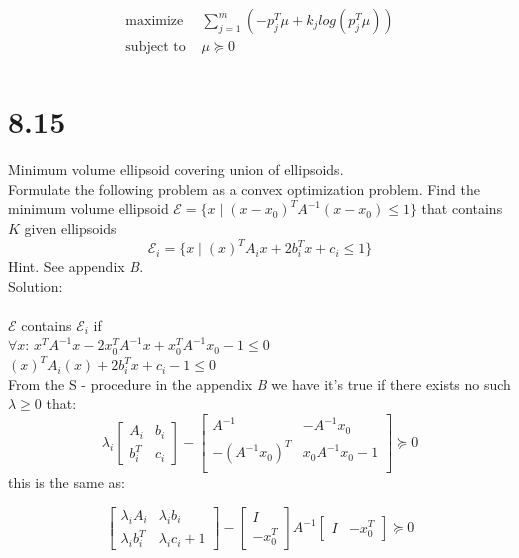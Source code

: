 \documentclass{article}
\begin{document}
\begin{align*}
\text{maximize } &
\sum_{j = 1}^{m}(-p_j^T \mu + k_j log(p_j^T\mu)) \\
\text{subject to } & \mu \succeq 0 \\
\end{align*} 

\section*{8.15}
Minimum volume ellipsoid covering union of ellipsoids.\\ Formulate the following problem
as a convex optimization problem. Find the minimum volume ellipsoid $\mathcal{E} = \{x \;| \; 
(x - x_0)^T A^{-1} (x - x_0) \leq 1\}$ that contains $K$ given ellipsoids 
$$
\mathcal{E}_i = \{x \;| \; (x)^T A_i x + 2b_i^Tx + c_i \leq 1\}
$$
Hint. See appendix \emph{{\color{red}B}}.\\

Solution:\\ \\
$\mathcal{E}$ contains $\mathcal{E}_i$ if \\
$\forall x: \, x^T A^{-1} x - 2 x_0^T A^{-1} x + x_0^T A^{-1}x_0 - 1 \leq 0$ \\
$(x)^T A_i (x) + 2b_i^Tx + c_i - 1 \leq 0$\\
From the S - procedure in the appendix \emph{{\color{red}B}} we have it's true if there exists no such $\lambda \geq 0$ that:\\

$$
\lambda_i
\begin{bmatrix}
A_i& b_i\\
b_i^T & c_i
\end{bmatrix} -
\begin{bmatrix}
A^{-1} & -A^{-1}x_0\\
-(A^{-1}x_0)^T & x_0A^{-1}x_0 - 1\\
\end{bmatrix}
  \succeq 0
$$
this is the same as:

$$
\begin{bmatrix}
	\lambda_i A_i& \lambda_i b_i\\
	\lambda_i b_i^T & \lambda_i c_i + 1
\end{bmatrix} - 
\begin{bmatrix}
I\\
-x_0^T
\end{bmatrix} A^{-1} 
\begin{bmatrix}
I &
-x_0^T
\end{bmatrix}
\succeq 0
$$
\end{document}
